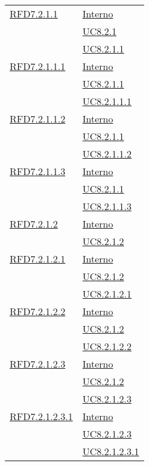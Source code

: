\begin{longtable}{|>{\centering}m{5cm}|m{5cm}<{\centering}|}
\hyperlink{RFD7.2.1.1}{RFD7.2.1.1} & \hyperlink{Interno}{Interno}\\
& \hyperref[UC8.2.1]{UC8.2.1}\\
& \hyperref[UC8.2.1.1]{UC8.2.1.1}\\ \hline

\hyperlink{RFD7.2.1.1.1}{RFD7.2.1.1.1} & \hyperlink{Interno}{Interno}\\
& \hyperref[UC8.2.1.1]{UC8.2.1.1}\\
& \hyperref[UC8.2.1.1.1]{UC8.2.1.1.1}\\ \hline

\hyperlink{RFD7.2.1.1.2}{RFD7.2.1.1.2} & \hyperlink{Interno}{Interno}\\
& \hyperref[UC8.2.1.1]{UC8.2.1.1}\\
& \hyperref[UC8.2.1.1.2]{UC8.2.1.1.2}\\ \hline

\hyperlink{RFD7.2.1.1.3}{RFD7.2.1.1.3} & \hyperlink{Interno}{Interno}\\
& \hyperref[UC8.2.1.1]{UC8.2.1.1}\\
& \hyperref[UC8.2.1.1.3]{UC8.2.1.1.3}\\ \hline

\hyperlink{RFD7.2.1.2}{RFD7.2.1.2} & \hyperlink{Interno}{Interno}\\
& \hyperref[UC8.2.1.2]{UC8.2.1.2}\\ \hline

\hyperlink{RFD7.2.1.2.1}{RFD7.2.1.2.1} & \hyperlink{Interno}{Interno}\\
& \hyperref[UC8.2.1.2]{UC8.2.1.2}\\
& \hyperref[UC8.2.1.2.1]{UC8.2.1.2.1}\\ \hline

\hyperlink{RFD7.2.1.2.2}{RFD7.2.1.2.2} & \hyperlink{Interno}{Interno}\\
& \hyperref[UC8.2.1.2]{UC8.2.1.2}\\
& \hyperref[UC8.2.1.2.2]{UC8.2.1.2.2}\\ \hline

\hyperlink{RFD7.2.1.2.3}{RFD7.2.1.2.3} & \hyperlink{Interno}{Interno}\\
& \hyperref[UC8.2.1.2]{UC8.2.1.2}\\
& \hyperref[UC8.2.1.2.3]{UC8.2.1.2.3}\\ \hline

\hyperlink{RFD7.2.1.2.3.1}{RFD7.2.1.2.3.1} & \hyperlink{Interno}{Interno}\\
& \hyperref[UC8.2.1.2.3]{UC8.2.1.2.3}\\
& \hyperref[UC8.2.1.2.3.1]{UC8.2.1.2.3.1}\\ \hline


\end{longtable}
